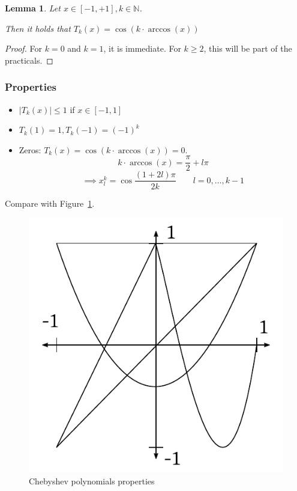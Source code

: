\documentclass{article}
\newtheorem*{lemma}{Lemma}
\newcommand{\card}[1]{\left|#1\right|}
\begin{document}
\begin{lemma}
  Let $x \in [-1,+1], k \in \mathbb N$.

  Then it holds that $T_k(x) = \cos(k \cdot \arccos(x))$
\end{lemma}

\begin{proof}
  For $k = 0$ and $k = 1$, it is immediate.
  For $k \geq 2$, this will be part of the practicals.
\end{proof}

\subsubsection{Properties}

\begin{itemize}
  \item $\card{T_k(x)} \leq 1$ if $x \in [-1,1]$
  \item $T_k(1) = 1, T_k(-1) = (-1)^k$
  \item Zeros: $T_k(x) = \cos(k \cdot \arccos(x)) = 0$.
    \[ k \cdot \arccos(x) = \frac\pi2  + l \pi \]
    \[ \implies x_l^k = \cos{\frac{(1 + 2l) \pi}{2k}} \qquad l=0,\dots,k-1 \]
\end{itemize}

Compare with Figure~\ref{img:cpp}.

\begin{figure}[!h]
  \begin{center}
    \includegraphics{img/03_chebyshev_polynomials_properties.pdf}
    \caption{Chebyshev polynomials properties}
    \label{img:cpp}
  \end{center}
\end{figure}
\end{document}
